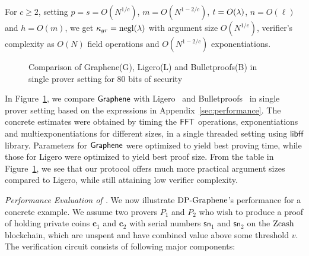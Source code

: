 \noindent For $c\geq 2$, setting $p=s=O(N^{1/c})$, $m=O(N^{1-2/c})$, $t=O(\lambda)$,
$n=O(\ell)$ and $h=O(m)$, we get $\kappa_{gr}=\mathrm{negl}(\lambda)$ with argument size
$O(N^{1/c})$, verifier's complexity as $O(N)$ field operations and
$O(N^{1-2/c})$ exponentiations. 

\begin{figure}[h]
\centering
{}
\caption{Comparison of Graphene(G), Ligero(L) and Bulletproofs(B) in single
prover setting for 80 bits of security}
\label{fig:standalonecompare}
\end{figure}

\noindent In Figure~\ref{fig:standalonecompare}, we compare
$\textsf{Graphene}$ with Ligero~\cite{ligero} and Bulletproofs~\cite{bulletproofs} in
single prover setting based on the expressions in Appendix~\ref{sec:performance}. The concrete estimates were obtained by timing the $\mathsf{FFT}$
operations, exponentiations and multiexponentiations for different sizes, in a
single threaded setting using $\mathsf{libff}$ library. Parameters for $\textsf{Graphene}$ were optimized to yield best
proving time, while those for Ligero were optimized to yield best proof size.
From the table in Figure~\ref{fig:standalonecompare}, we see that our protocol offers much more practical argument
sizes compared to Ligero, while still attaining low verifier complexity. 


{\em Performance Evaluation of \dpname.}
We now illustrate $\text{DP-Graphene}$'s performance for a concrete example. We assume two
provers $P_1$ and $P_2$ who wish to produce a proof of holding private coins
$\bm{c}_1$ and $\bm{c}_2$ with serial
numbers $\mathsf{sn}_1$ and $\mathsf{sn}_2$ on the $\mathrm{Zcash}$ blockchain, which
are unspent and have combined value above some threshold $v$. The verification
circuit consists of following major components:

